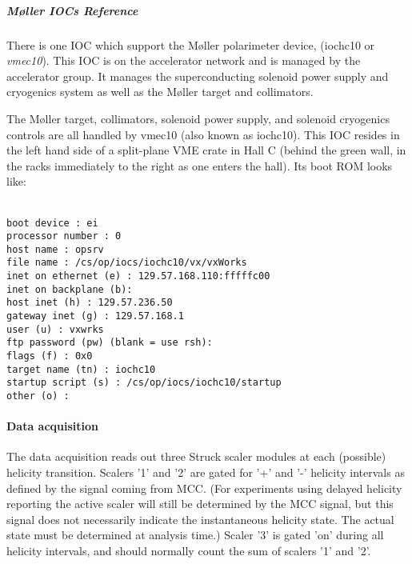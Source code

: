 {\subparagraph{M\o ller IOCs Reference}

There is one IOC which support the M\o ller polarimeter device,
(iochc10 or {\it vmec10}). This IOC is on the accelerator network and
is managed by the accelerator group. It manages the superconducting
solenoid power supply and cryogenics system as well as the M\o ller
target and collimators.

The M\o ller target, collimators, solenoid power supply, and solenoid
cryogenics controls are all handled by vmec10 (also known as
iochc10). This IOC resides in the left hand side of a split-plane VME
crate in Hall C (behind the green wall, in the racks immediately to
the right as one enters the hall).  Its boot ROM looks like:

\texttt{\\
boot device          : ei \\
processor number     : 0 \\
host name            : opsrv \\
file name            : /cs/op/iocs/iochc10/vx/vxWorks \\
inet on ethernet (e) : 129.57.168.110:fffffc00 \\
inet on backplane (b): \\
host inet (h)        : 129.57.236.50 \\
gateway inet (g)     : 129.57.168.1 \\
user (u)             : vxwrks \\
ftp password (pw) (blank = use rsh): \\
flags (f)            : 0x0 \\
target name (tn)     : iochc10 \\
startup script (s)   : /cs/op/iocs/iochc10/startup \\
other (o)            : \\
}



%
\paragraph{Data acquisition}
The data acquisition reads out three Struck scaler modules at each
(possible) helicity transition. Scalers '1' and '2' are gated for '+'
and '-' helicity intervals as defined by the signal coming from
MCC. (For experiments using delayed helicity reporting the active
scaler will still be determined by the MCC signal, but this signal
does not necessarily indicate the instantaneous helicity state. The
actual state must be determined at analysis time.) Scaler '3' is gated
'on' during all helicity intervals, and should normally count the sum
of scalers '1' and '2'.

}
